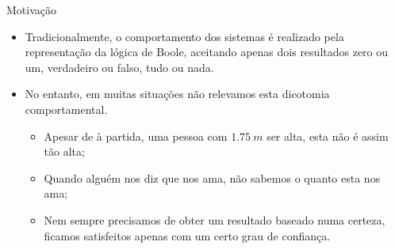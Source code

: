 \documentclass[portuges]{beamer}
\begin{document}
\begin{frame}{Motivação}
\begin{itemize}[<+->]
	\item Tradicionalmente, o comportamento dos sistemas é realizado
		pela representação da lógica de Boole, aceitando apenas dois resultados
		\alert{zero ou um}, \alert{verdadeiro ou falso}, tudo ou nada.
	\item No entanto, em muitas situações não relevamos esta dicotomia comportamental.
		\begin{itemize}
			\item Apesar de à partida, uma pessoa com $1.75\ m$ ser alta, esta não é assim
			tão alta;
			\item Quando alguém nos diz que nos ama, \alert{não sabemos o quanto} esta nos ama;
			\item Nem sempre precisamos de obter um resultado baseado numa \alert{certeza},
			ficamos satisfeitos apenas com um certo grau de \alert{confiança}.
		\end{itemize}		 
\end{itemize}

\end{frame}
\end{document}
